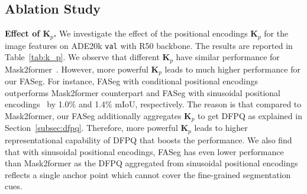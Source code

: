 \begin{table}[t!]
\centering
\caption{Performance comparisons between DFPQ and other positional queries variants on ADE20K \texttt{val}~\cite{zhou2017scene} with 150 categories.}
\vspace{-0.5em}
\label{tab:abl_positional}
\vspace{-1em}
\end{table}

\subsection{Ablation Study}\label{subsec:abl}

\noindent\textbf{Effect of $\boldsymbol{K}_p$.} We investigate the effect of the positional encodings $\boldsymbol{K}_p$ for the image features on ADE20k \texttt{val} with R50 backbone. The results are reported in Table~\ref{tab:k_p}. We observe that different $\boldsymbol{K}_p$ have similar performance for Mask2former~\cite{cheng2021masked}. However, more powerful $\boldsymbol{K}_p$ leads to much higher performance for our FASeg. For instance, FASeg with conditional positional encodings~\cite{chu2021conditional} outperforms Mask2former counterpart and FASeg with sinusoidal positional encodings~\cite{carion2020end} by 1.0\% and 1.4\% mIoU, respectively. The reason is that compared to Mask2former, our FASeg additionally aggregates $\boldsymbol{K}_p$ to get DFPQ as explained in Section~\ref{subsec:dfpq}. Therefore, more powerful $\boldsymbol{K}_p$ leads to higher representational capability of DFPQ that boosts the performance. We also find that with sinusoidal positional encodings, FASeg has even lower performance than Mask2former as the DFPQ aggregated from sinusoidal positional encodings reflects a single anchor point which cannot cover the fine-grained segmentation cues.

